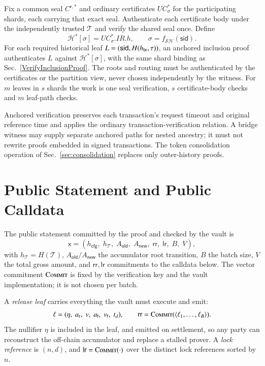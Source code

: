 Fix a common seal $C^{\mathsf r,*}$ and ordinary certificates $UC^*_\sigma$ for the participating shards, each carrying that exact seal. Authenticate each certificate body under the independently trusted $\mathcal T$ and verify the shared seal once. Define
\[
\mathcal H^*[\sigma]=UC^*_\sigma.IR.h,\qquad
\sigma=f_{\mathcal{SH}}(\mathsf{sid}).
\]
For each required historical leaf $L=(\mathsf{sid},H({h_\mathsf{tx}},\tau))$, an anchored inclusion proof authenticates $L$ against $\mathcal H^*[\sigma]$, with the same shard binding as Sec.~\ref{VerifyInclusionProof}. The roots and routing must be authenticated by the certificates or the partition view, never chosen independently by the witness. For $m$ leaves in $s$ shards the work is one seal verification, $s$ certificate-body checks and $m$ leaf-path checks.

Anchored verification preserves each transaction's request timeout and original reference time and applies the ordinary transaction-verification relation. A bridge witness may supply separate anchored paths for nested ancestry; it must not rewrite proofs embedded in signed transactions. The token consolidation operation of Sec.~\ref{sec:consolidation} replaces only outer-history proofs.

\section{Public Statement and Public Calldata}\label{app:bridging-public}

The public statement committed by the proof and checked by the vault is
\[
\mathsf{x} = (h_\mathsf{cfg},\; h_\mathcal{T},\; A_\mathsf{old},\; A_\mathsf{new},\; \mathsf{rr},\; \mathsf{lr},\; B,\; V),
\]
with $h_\mathcal{T} = H(\mathcal{T})$, $A_\mathsf{old}/A_\mathsf{new}$ the accumulator root transition, $B$ the batch size, $V$ the total gross amount, and $\mathsf{rr}, \mathsf{lr}$ commitments to the calldata below. The vector commitment $\Call{Commit}{}$ is fixed by the verification key and the vault implementation; it is not chosen per batch.

A \emph{release leaf} carries everything the vault must execute and emit:
\[
\ell = (\eta,\; a_\mathsf{r},\; v,\; a_\mathsf{f},\; v_\mathsf{f},\; t_d),
\qquad \mathsf{rr} = \Call{Commit}{\langle \ell_1,\ldots,\ell_B \rangle}.
\]
The nullifier $\eta$ is included in the leaf, and emitted on settlement, so any party can reconstruct the off-chain accumulator and replace a stalled prover. A \emph{lock reference} is $(n,d)$, and $\mathsf{lr} = \Call{Commit}{\cdot}$ over the distinct lock references sorted by $n$.

